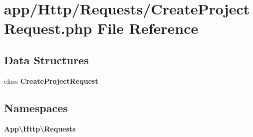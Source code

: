 \section{app/\+Http/\+Requests/\+Create\+Project\+Request.php File Reference}
\label{_create_project_request_8php}
\subsection*{Data Structures}
\begin{DoxyCompactItemize}
\item 
class {\bf Create\+Project\+Request}
\end{DoxyCompactItemize}
\subsection*{Namespaces}
\begin{DoxyCompactItemize}
\item 
 {\bf App\textbackslash{}\+Http\textbackslash{}\+Requests}
\end{DoxyCompactItemize}
